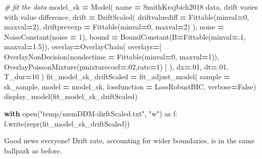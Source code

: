 \documentclass[
]{book}
\newenvironment{Shaded}{\begin{snugshade}}{\end{snugshade}}
\newcommand{\BuiltInTok}[1]{#1}
\newcommand{\CommentTok}[1]{\textcolor[rgb]{0.56,0.35,0.01}{\textit{#1}}}
\newcommand{\ControlFlowTok}[1]{\textcolor[rgb]{0.13,0.29,0.53}{\textbf{#1}}}
\newcommand{\DecValTok}[1]{\textcolor[rgb]{0.00,0.00,0.81}{#1}}
\newcommand{\FloatTok}[1]{\textcolor[rgb]{0.00,0.00,0.81}{#1}}
\newcommand{\ImportTok}[1]{#1}
\newcommand{\NormalTok}[1]{#1}
\newcommand{\OperatorTok}[1]{\textcolor[rgb]{0.81,0.36,0.00}{\textbf{#1}}}
\newcommand{\StringTok}[1]{\textcolor[rgb]{0.31,0.60,0.02}{#1}}
\newcommand{\VariableTok}[1]{\textcolor[rgb]{0.00,0.00,0.00}{#1}}
\begin{document}
\begin{Shaded}
\begin{Highlighting}[]
\CommentTok{\# fit the data}
\NormalTok{model\_sk }\OperatorTok{=}\NormalTok{ Model(}
\NormalTok{  name }\OperatorTok{=} \StringTok{\textquotesingle{}SmithKrajbich2018 data, drift varies with value difference\textquotesingle{}}\NormalTok{,}
\NormalTok{  drift }\OperatorTok{=}\NormalTok{ DriftScaled(}
\NormalTok{    driftvaluediff }\OperatorTok{=}\NormalTok{ Fittable(minval}\OperatorTok{=}\DecValTok{0}\NormalTok{, maxval}\OperatorTok{=}\DecValTok{2}\NormalTok{),}
\NormalTok{    driftprevexp   }\OperatorTok{=}\NormalTok{ Fittable(minval}\OperatorTok{=}\DecValTok{0}\NormalTok{, maxval}\OperatorTok{=}\DecValTok{2}\NormalTok{)}
\NormalTok{  ),}
\NormalTok{  noise }\OperatorTok{=}\NormalTok{ NoiseConstant(noise }\OperatorTok{=} \DecValTok{1}\NormalTok{),}
\NormalTok{  bound }\OperatorTok{=}\NormalTok{ BoundConstant(B}\OperatorTok{=}\NormalTok{Fittable(minval}\OperatorTok{=}\FloatTok{.1}\NormalTok{, maxval}\OperatorTok{=}\FloatTok{1.5}\NormalTok{)),}
\NormalTok{  overlay}\OperatorTok{=}\NormalTok{OverlayChain(}
\NormalTok{    overlays}\OperatorTok{=}\NormalTok{[}
\NormalTok{      OverlayNonDecision(nondectime }\OperatorTok{=}\NormalTok{ Fittable(minval}\OperatorTok{=}\DecValTok{0}\NormalTok{, maxval}\OperatorTok{=}\DecValTok{1}\NormalTok{)), }
\NormalTok{      OverlayPoissonMixture(pmixturecoef}\OperatorTok{=}\FloatTok{.02}\NormalTok{,rate}\OperatorTok{=}\DecValTok{1}\NormalTok{)}
\NormalTok{    ]}
\NormalTok{  ),}
\NormalTok{  dx}\OperatorTok{=}\FloatTok{.01}\NormalTok{, }
\NormalTok{  dt}\OperatorTok{=}\FloatTok{.01}\NormalTok{, }
\NormalTok{  T\_dur}\OperatorTok{=}\DecValTok{10}
\NormalTok{)}
\NormalTok{fit\_model\_sk\_driftScaled }\OperatorTok{=}\NormalTok{ fit\_adjust\_model(}
\NormalTok{  sample }\OperatorTok{=}\NormalTok{ sk\_sample, }
\NormalTok{  model }\OperatorTok{=}\NormalTok{ model\_sk,}
\NormalTok{  lossfunction }\OperatorTok{=}\NormalTok{ LossRobustBIC,}
\NormalTok{  verbose}\OperatorTok{=}\VariableTok{False}\NormalTok{)}
\NormalTok{display\_model(fit\_model\_sk\_driftScaled)}

\ControlFlowTok{with} \BuiltInTok{open}\NormalTok{(}\StringTok{"temp/memDDM{-}dirftScaled.txt"}\NormalTok{, }\StringTok{"w"}\NormalTok{) }\ImportTok{as}\NormalTok{ f:}
\NormalTok{    f.write(}\BuiltInTok{repr}\NormalTok{(fit\_model\_sk\_driftScaled))}
\end{Highlighting}
\end{Shaded}

Good news everyone! Drift rate, accounting for wider boundaries, is in the same ballpark as before.
\end{document}

